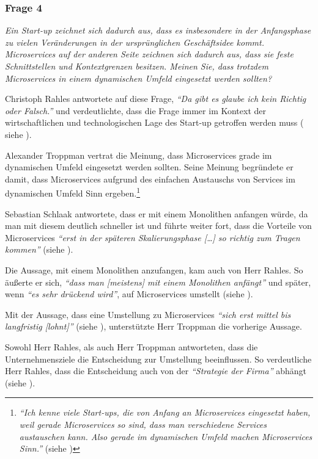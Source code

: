 \subsubsection{Frage 4}

\textit{Ein Start-up zeichnet sich dadurch aus, dass es insbesondere in der Anfangsphase zu vielen Veränderungen in der ursprünglichen Geschäftsidee kommt. Microservices auf der anderen Seite zeichnen sich dadurch aus, dass sie feste Schnittstellen und Kontextgrenzen besitzen. Meinen Sie, dass trotzdem Microservices in einem dynamischen Umfeld eingesetzt werden sollten?}

Christoph Rahles antwortete auf diese Frage, \textit{\enquote{Da gibt es glaube ich kein Richtig oder Falsch.}} und verdeutlichte, dass die Frage immer im Kontext der wirtschaftlichen und technologischen Lage des Start-up getroffen werden muss ( siehe ).

Alexander Troppman vertrat die Meinung, dass Microservices grade im dynamischen Umfeld eingesetzt werden sollten. Seine Meinung begründete er damit, dass Microservices aufgrund des einfachen Austauschs von Services im dynamischen Umfeld Sinn ergeben.\footnote{
\textit{\enquote{Ich kenne viele Start-ups, die von Anfang an Microservices eingesetzt haben, weil gerade Microservices so sind, dass man verschiedene Services austauschen kann. Also gerade im dynamischen Umfeld machen Microservices Sinn.}} (siehe )
}

Sebastian Schlaak antwortete, dass er mit einem Monolithen anfangen würde, da man mit diesem deutlich schneller ist und führte weiter fort, dass die Vorteile von Microservices \textit{\enquote{erst in der späteren Skalierungsphase […] so richtig zum Tragen kommen}} (siehe ).

Die Aussage, mit einem Monolithen anzufangen, kam auch von Herr Rahles. So äußerte er sich, \textit{\enquote{dass man [meistens] mit einem Monolithen anfängt}} und später, wenn \textit{\enquote{es sehr drückend wird}}, auf Microservices umstellt (siehe ).

Mit der Aussage, dass eine Umstellung zu Microservices \textit{\enquote{sich erst mittel bis langfristig [lohnt]}} (siehe ), unterstützte Herr Troppman die vorherige Aussage.

Sowohl Herr Rahles, als auch Herr Troppman antworteten, dass die Unternehmensziele die Entscheidung zur Umstellung beeinflussen. So verdeutliche Herr Rahles, dass die Entscheidung auch von der \textit{\enquote{Strategie der Firma}} abhängt (siehe ).

